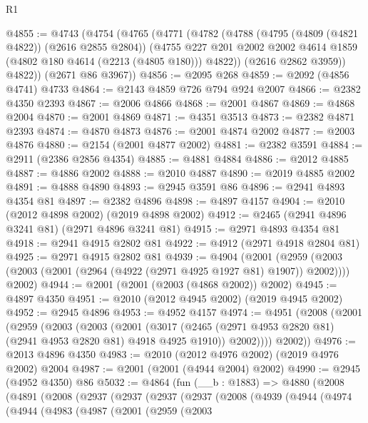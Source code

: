 \begin{lexlean}{R1}
\begin{coremodule}
@4855 := @4743
    (@4754
      (@4765
        (@4771
          (@4782
            (@4788
              (@4795 (@4809 (@4821 @4822)) (@2616 @2855 @2804))
              (@4755
                @227
                @201
                @2002
                @2002
                @4614
                @1859
                (@4802 @180 @4614 (@2213 (@4805 @180)))
                @4822))
            (@2616 @2862 @3959))
          @4822))
      (@2671 @86 @3967))
@4856 := @2095 @268
@4859 := @2092 (@4856 @4741) @4733
@4864 := @2143 @4859 @726 @794 @924 @2007
@4866 := @2382 @4350 @2393
@4867 := @2006 @4866
@4868 := @2001 @4867
@4869 := @4868 @2004
@4870 := @2001 @4869
@4871 := @4351 @3513
@4873 := @2382 @4871 @2393
@4874 := @4870 @4873
@4876 := @2001 @4874 @2002
@4877 := @2003 @4876
@4880 := @2154 (@2001 @4877 @2002)
@4881 := @2382 @3591
@4884 := @2911 (@2386 @2856 @4354)
@4885 := @4881 @4884
@4886 := @2012 @4885
@4887 := @4886 @2002
@4888 := @2010 @4887
@4890 := @2019 @4885 @2002
@4891 := @4888 @4890
@4893 := @2945 @3591 @86
@4896 := @2941 @4893 @4354 @81
@4897 := @2382 @4896
@4898 := @4897 @4157
@4904 := @2010 (@2012 @4898 @2002) (@2019 @4898 @2002)
@4912 := @2465 (@2941 @4896 @3241 @81) (@2971 @4896 @3241 @81)
@4915 := @2971 @4893 @4354 @81
@4918 := @2941 @4915 @2802 @81
@4922 := @4912 (@2971 @4918 @2804 @81)
@4925 := @2971 @4915 @2802 @81
@4939 := @4904
    (@2001
      (@2959 (@2003 (@2003 (@2001 (@2964 (@4922 (@2971 @4925 @1927 @81) @1907)) @2002))))
      @2002)
@4944 := @2001 (@2001 (@2003 (@4868 @2002)) @2002)
@4945 := @4897 @4350
@4951 := @2010 (@2012 @4945 @2002) (@2019 @4945 @2002)
@4952 := @2945 @4896
@4953 := @4952 @4157
@4974 := @4951
    (@2008
      (@2001
        (@2959
          (@2003
            (@2003
              (@2001
                (@3017 (@2465 (@2971 @4953 @2820 @81) (@2941 @4953 @2820 @81) @4918 @4925 @1910))
                @2002))))
        @2002))
@4976 := @2013 @4896 @4350
@4983 := @2010 (@2012 @4976 @2002) (@2019 @4976 @2002) @2004
@4987 := @2001 (@2001 (@4944 @2004) @2002)
@4990 := @2945 (@4952 @4350) @86
@5032 := @4864
    (fun (__b : @1883) =>
    @4880
      (@2008
        (@4891
          (@2008
            (@2937
              (@2937
                (@2937
                  (@2937
                    (@2008
                      (@4939
                        (@4944
                          (@4974
                            (@4944
                              (@4983
                                (@4987
                                  (@2001
                                    (@2959
                                      (@2003

\end{coremodule}
\end{lexlean}

